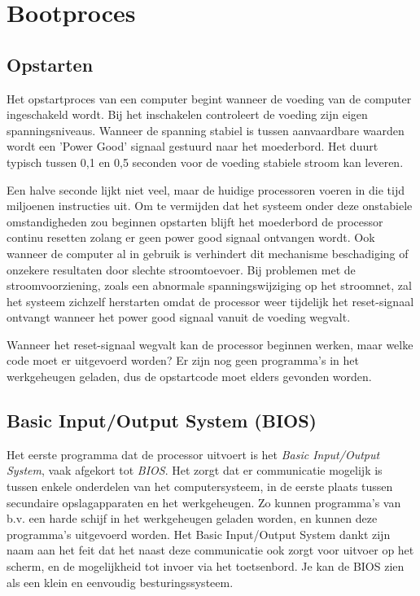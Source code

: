 \chapter{Bootproces}

\section{Opstarten}

Het opstartproces van een computer begint wanneer de voeding van
de computer ingeschakeld wordt. Bij het inschakelen controleert de
voeding zijn eigen spanningsniveaus. Wanneer de spanning stabiel is
tussen aanvaardbare waarden wordt een 'Power Good' signaal
gestuurd naar het moederbord. Het duurt typisch tussen 0,1 en 0,5
seconden voor de voeding stabiele stroom kan leveren.

Een halve seconde lijkt niet veel, maar de huidige processoren
voeren in die tijd miljoenen instructies uit. Om te vermijden dat het
systeem onder deze onstabiele omstandigheden zou beginnen opstarten
blijft het moederbord de processor continu resetten zolang er geen power
good signaal ontvangen wordt. Ook wanneer de computer al in gebruik is
verhindert dit mechanisme beschadiging of onzekere resultaten door
slechte stroomtoevoer. Bij problemen met de stroomvoorziening, zoals een
abnormale spanningswijziging op het stroomnet, zal het systeem zichzelf
herstarten omdat de processor weer tijdelijk het reset-signaal ontvangt
wanneer het power good signaal vanuit de voeding wegvalt.

Wanneer het reset-signaal wegvalt kan de processor beginnen
werken, maar welke code moet er uitgevoerd worden? Er zijn nog geen
programma's in het werkgeheugen geladen, dus de opstartcode moet elders
gevonden worden.

\section{Basic Input/Output System (BIOS)}

Het eerste programma dat de processor uitvoert is het
\emph{Basic Input/Output System}, vaak afgekort tot
\emph{BIOS}. Het zorgt dat er communicatie mogelijk is
tussen enkele onderdelen van het computersysteem, in de eerste plaats
tussen secundaire opslagapparaten en het werkgeheugen. Zo kunnen
programma's van b.v. een harde schijf in het werkgeheugen geladen
worden, en kunnen deze programma's uitgevoerd worden. Het Basic
Input/Output System dankt zijn naam aan het feit dat het naast deze
communicatie ook zorgt voor uitvoer op het scherm, en de mogelijkheid
tot invoer via het toetsenbord. Je kan de BIOS zien als een klein en
eenvoudig besturingssysteem.

